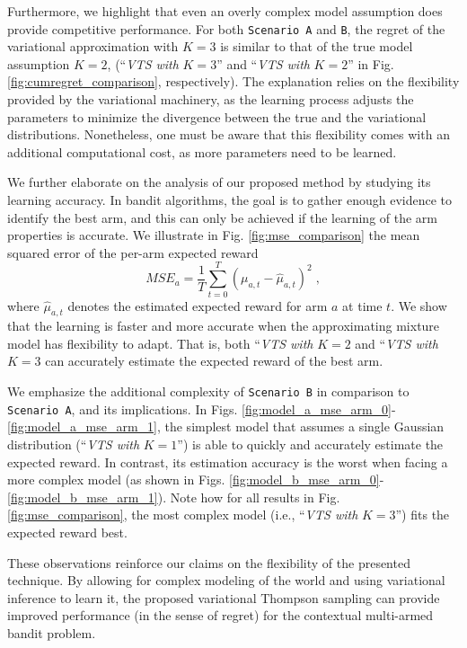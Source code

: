 \documentclass{article}
\newcommand{\ie}{i.e., }
\begin{document}
Furthermore, we highlight that even an overly complex model assumption does provide competitive performance. For both \texttt{Scenario A} and \texttt{B}, the regret of the variational approximation with $K=3$ is similar to that of the true model assumption $K=2$, (``\textit{VTS with }$K=3$'' and ``\textit{VTS with }$K=2$'' in Fig. \ref{fig:cumregret_comparison}, respectively). The explanation relies on the flexibility provided by the variational machinery, as the learning process adjusts the parameters to minimize the divergence between the true and the variational distributions. Nonetheless, one must be aware that this flexibility comes with an additional computational cost, as more parameters need to be learned.

We further elaborate on the analysis of our proposed method by studying its learning accuracy. In bandit algorithms, the goal is to gather enough evidence to identify the best arm, and this can only be achieved if the learning of the arm properties is accurate. We illustrate in Fig. \ref{fig:mse_comparison} the mean squared error of the per-arm expected reward
\begin{equation}
MSE_a=\frac{1}{T}\sum_{t=0}^T \left(\mu_{a,t}-\hat{\mu}_{a,t} \right)^2 \; ,
\end{equation}
where $\hat{\mu}_{a,t}$ denotes the estimated expected reward for arm $a$ at time $t$. We show that the learning is faster and more accurate when the approximating mixture model has flexibility to adapt. That is, both ``\textit{VTS with }$K=2$ and ``\textit{VTS with }$K=3$ can accurately estimate the expected reward of the best arm.

We emphasize the additional complexity of \texttt{Scenario B} in comparison to \texttt{Scenario A}, and its implications. In Figs. \ref{fig:model_a_mse_arm_0}-\ref{fig:model_a_mse_arm_1}, the simplest model that assumes a single Gaussian distribution (``\textit{VTS with }$K=1$'') is able to quickly and accurately estimate the expected reward. In contrast, its estimation accuracy is the worst when facing a more complex model (as shown in Figs. \ref{fig:model_b_mse_arm_0}-\ref{fig:model_b_mse_arm_1}). Note how for all results in Fig. \ref{fig:mse_comparison}, the most complex model (\ie ``\textit{VTS with }$K=3$'') fits the expected reward best.

These observations reinforce our claims on the flexibility of the presented technique. By allowing for complex modeling of the world and using variational inference to learn it, the proposed variational Thompson sampling can provide improved performance (in the sense of regret) for the contextual multi-armed bandit problem.
\end{document}

